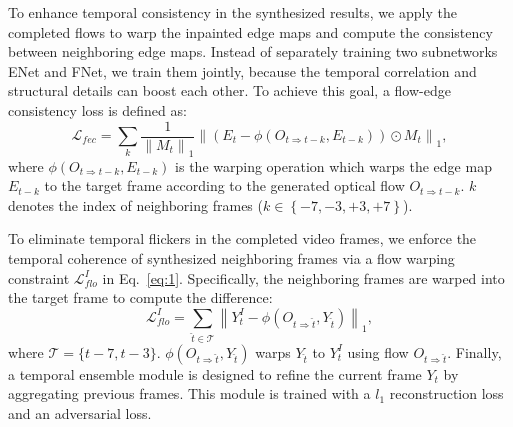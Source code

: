 To enhance temporal consistency in the synthesized results, we apply the completed flows to warp the inpainted edge maps and compute the consistency between neighboring edge maps. 
%
Instead of separately training two subnetworks ENet and FNet, we train them jointly, because the temporal correlation and structural details can boost each other. 
To achieve this goal, a flow-edge consistency loss is defined as:
%
\begin{equation}
	\label{eq:flow_edge}
	\mathcal{L}_{fec}=\sum_{k}\frac{1}{\left\|M_{t} \right\|_1}\left\|(E_{t}-\phi(O_{t\Rightarrow t-k},E_{t-k}))\odot M_{t}\right\|_1,
\end{equation}
where $\phi(O_{t\Rightarrow t-k},E_{t-k})$ is the warping operation which warps the edge map $E_{t-k}$ to the target frame according to the generated optical flow $O_{t\Rightarrow t-k}$.
$k$ denotes the index of neighboring frames ($k\in \left\{-7,-3,+3,+7 \right\}$). 


To eliminate temporal flickers in the completed video frames, we enforce the temporal coherence of synthesized neighboring frames via a flow warping constraint $\mathcal{L}^I_{flo}$ in Eq.~\eqref{eq:1}. 
%
Specifically, the neighboring frames are warped into the target frame to compute the difference: 
\begin{equation}
\label{eq:inp_flow}
\mathcal{L}^I_{flo}=\sum_{\widehat{t}\in\mathcal{T}}\left\| Y^I_t-\phi(O_{t\Rightarrow \widehat{t}},Y_{\widehat{t}}) \right\|_1,
\end{equation}
where $\mathcal{T}=\{t-7,t-3\}$. $\phi(O_{t\Rightarrow \widehat{t}},Y_{\widehat{t}})$ warps $Y_{\widehat{t}}$ to $Y^I_{t}$ using flow $O_{t\Rightarrow \widehat{t}}$.
%
Finally, a temporal ensemble module is designed 
to refine the current frame $Y_t$ by aggregating previous frames. %
This module is trained with a $l_1$ reconstruction loss and an adversarial loss.







